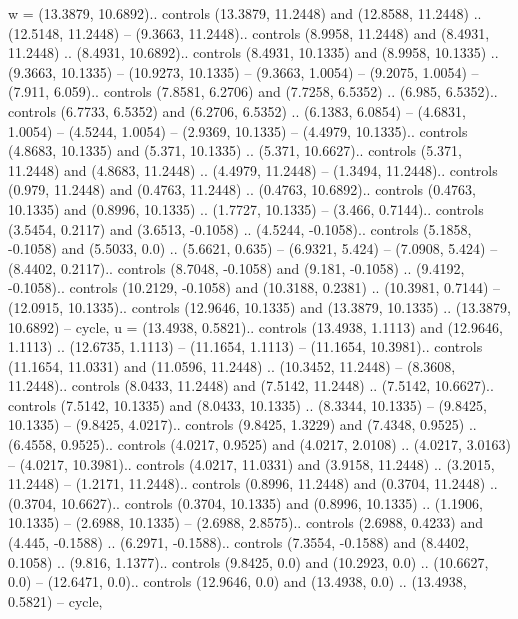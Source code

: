 {w} = {(13.3879, 10.6892).. controls (13.3879, 11.2448) and (12.8588, 11.2448) .. (12.5148, 11.2448) -- (9.3663, 11.2448).. controls (8.9958, 11.2448) and (8.4931, 11.2448) .. (8.4931, 10.6892).. controls (8.4931, 10.1335) and (8.9958, 10.1335) .. (9.3663, 10.1335) -- (10.9273, 10.1335) -- (9.3663, 1.0054) -- (9.2075, 1.0054) -- (7.911, 6.059).. controls (7.8581, 6.2706) and (7.7258, 6.5352) .. (6.985, 6.5352).. controls (6.7733, 6.5352) and (6.2706, 6.5352) .. (6.1383, 6.0854) -- (4.6831, 1.0054) -- (4.5244, 1.0054) -- (2.9369, 10.1335) -- (4.4979, 10.1335).. controls (4.8683, 10.1335) and (5.371, 10.1335) .. (5.371, 10.6627).. controls (5.371, 11.2448) and (4.8683, 11.2448) .. (4.4979, 11.2448) -- (1.3494, 11.2448).. controls (0.979, 11.2448) and (0.4763, 11.2448) .. (0.4763, 10.6892).. controls (0.4763, 10.1335) and (0.8996, 10.1335) .. (1.7727, 10.1335) -- (3.466, 0.7144).. controls (3.5454, 0.2117) and (3.6513, -0.1058) .. (4.5244, -0.1058).. controls (5.1858, -0.1058) and (5.5033, 0.0) .. (5.6621, 0.635) -- (6.9321, 5.424) -- (7.0908, 5.424) -- (8.4402, 0.2117).. controls (8.7048, -0.1058) and (9.181, -0.1058) .. (9.4192, -0.1058).. controls (10.2129, -0.1058) and (10.3188, 0.2381) .. (10.3981, 0.7144) -- (12.0915, 10.1335).. controls (12.9646, 10.1335) and (13.3879, 10.1335) .. (13.3879, 10.6892) -- cycle},
{u} = {(13.4938, 0.5821).. controls (13.4938, 1.1113) and (12.9646, 1.1113) .. (12.6735, 1.1113) -- (11.1654, 1.1113) -- (11.1654, 10.3981).. controls (11.1654, 11.0331) and (11.0596, 11.2448) .. (10.3452, 11.2448) -- (8.3608, 11.2448).. controls (8.0433, 11.2448) and (7.5142, 11.2448) .. (7.5142, 10.6627).. controls (7.5142, 10.1335) and (8.0433, 10.1335) .. (8.3344, 10.1335) -- (9.8425, 10.1335) -- (9.8425, 4.0217).. controls (9.8425, 1.3229) and (7.4348, 0.9525) .. (6.4558, 0.9525).. controls (4.0217, 0.9525) and (4.0217, 2.0108) .. (4.0217, 3.0163) -- (4.0217, 10.3981).. controls (4.0217, 11.0331) and (3.9158, 11.2448) .. (3.2015, 11.2448) -- (1.2171, 11.2448).. controls (0.8996, 11.2448) and (0.3704, 11.2448) .. (0.3704, 10.6627).. controls (0.3704, 10.1335) and (0.8996, 10.1335) .. (1.1906, 10.1335) -- (2.6988, 10.1335) -- (2.6988, 2.8575).. controls (2.6988, 0.4233) and (4.445, -0.1588) .. (6.2971, -0.1588).. controls (7.3554, -0.1588) and (8.4402, 0.1058) .. (9.816, 1.1377).. controls (9.8425, 0.0) and (10.2923, 0.0) .. (10.6627, 0.0) -- (12.6471, 0.0).. controls (12.9646, 0.0) and (13.4938, 0.0) .. (13.4938, 0.5821) -- cycle},
